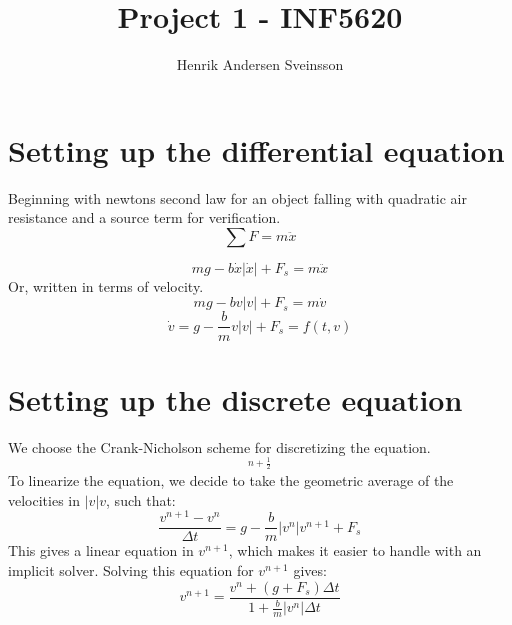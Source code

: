 \documentclass[a4paper, 10pt]{article}
\title{Project 1 - INF5620}
\author{Henrik Andersen Sveinsson}
\begin{document}
\maketitle

\section{Setting up the differential equation}
Beginning with newtons second law for an object falling  with quadratic  air resistance and a source term for verification.
\begin{equation}
	\sum F = m\ddot{x}
\end{equation}


\begin{equation}
	mg - b\dot{x}|\dot{x}| + F_s = m\ddot{x}
\end{equation}
Or, written in terms of velocity.
\begin{equation}
	mg- bv|v| + F_s = m\dot{v}
\end{equation}
\begin{equation}
	\dot{v} = g - \frac{b}{m}v|v| + F_s = f(t, v)
\end{equation}

\section{Setting up the discrete equation}
\label{sec:setting_up_the_discrete_equation}

We choose the Crank-Nicholson scheme for discretizing the equation. 
\begin{equation}
	[D_t v = f(t, \bar{v}^{t, \frac{1}{2}})]^{n+\frac{1}{2}}
\end{equation}
To linearize the equation, we decide to take the geometric average of the velocities in $|v|v$, such that:
\begin{equation}
	\frac{v^{n+1} - v^{n}}{\Delta t} = g - \frac{b}{m}|v^n|v^{n+1} + F_s
\end{equation}
This gives a linear equation in $v^{n+1}$, which makes it easier to handle with an implicit solver. Solving this equation for $v^{n+1}$ gives:
\begin{equation}
	v^{n+1} = \frac{v^n + (g +F_s)\Delta t}{1+\frac{b}{m}|v^n|\Delta t}
\end{equation}
\end{document}
